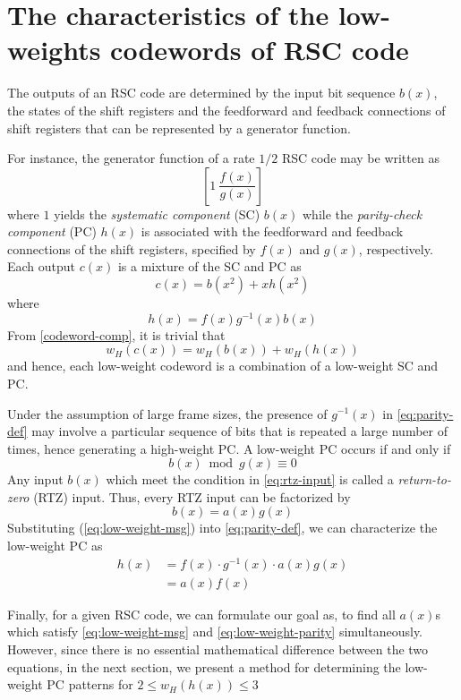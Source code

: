 \section{The characteristics of the low-weights codewords of RSC code}
\label{sec2}
The outputs of an RSC code are determined by the input bit sequence $b(x)$, the states of the shift registers and the feedforward and feedback connections of shift registers that can be represented by a generator function. 

For instance,  the generator function of a rate $1/2$ RSC code may be written as  $$\left[1 ~\frac{f(x)}{g(x)}\right]$$ where $1$ yields the \textit{systematic  component} (SC) $b(x)$ while the \textit{parity-check component} (PC) $h(x)$ is associated with the feedforward and feedback connections of the shift registers, specified by $f(x)$ and $g(x)$, respectively. Each output $c(x)$ is a mixture of the SC and PC as
\begin{equation}
c(x) = b(x^2)+xh(x^2)
\label{codeword-comp}
\end{equation}
where 
\begin{equation}
h(x) =f(x)g^{-1}(x)b(x)
\label{eq:parity-def}
\end{equation}
From \eqref{codeword-comp}, it is trivial that
\begin{equation}
w_H(c(x))=w_H(b(x)) + w_H(h(x))
\label{eq:cw-weight}
\end{equation}
and hence, each low-weight codeword is a combination of a low-weight SC and PC.

Under the assumption of large frame sizes, the presence of $g^{-1}(x)$  in \eqref{eq:parity-def} may involve a particular sequence of bits that is repeated a large number of times, hence generating a high-weight PC. A low-weight PC occurs if and only if
\begin{equation}
b(x) \bmod g(x) \equiv 0
\label{eq:rtz-input}
\end{equation}
Any input $b(x)$ which meet the condition in \eqref{eq:rtz-input} is called a \textit{return-to-zero} (RTZ) input. Thus, every RTZ input can be factorized by  
\begin{equation}
b(x) =a(x)g(x)
\label{eq:low-weight-msg}
\end{equation}
Substituting (\ref{eq:low-weight-msg}) into \eqref{eq:parity-def}, we can characterize the low-weight PC as
\begin{equation}
\begin{split}
h(x)&=f(x)\cdot g^{-1}(x)\cdot a(x)g(x)\\
&=a(x)f(x)
\end{split}
\label{eq:low-weight-parity}
\end{equation}

Finally, for a given RSC code, we can formulate our goal as, to find all $a(x)$s which satisfy  \eqref{eq:low-weight-msg} and  \eqref{eq:low-weight-parity} simultaneously. However, since there is no essential mathematical difference between the two equations, in the next section, we present a method for determining the low-weight PC patterns for $2 \leq w_H(h(x)) \leq 3$



